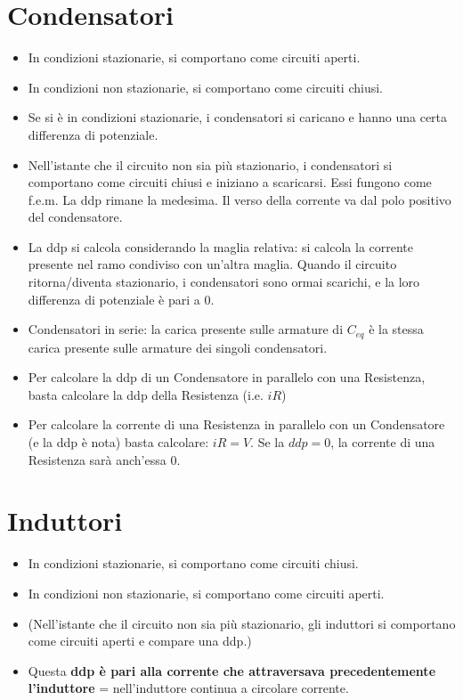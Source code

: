 \documentclass[17pt]{extarticle}
\begin{document}
\section{Condensatori}
\begin{itemize}
    \item In condizioni stazionarie, si comportano come circuiti aperti.
    \item In condizioni non stazionarie, si comportano come circuiti chiusi.
    \item Se si è in condizioni stazionarie, i condensatori si caricano e hanno una certa differenza di potenziale.
    \item Nell’istante che il circuito non sia più stazionario, i condensatori si comportano come circuiti chiusi e iniziano a scaricarsi. Essi fungono come f.e.m. La ddp rimane la medesima. Il verso della corrente va dal polo positivo del condensatore.
    \item La ddp si calcola considerando la maglia relativa: si calcola la corrente presente nel ramo condiviso con un’altra maglia. Quando il circuito ritorna/diventa stazionario, i condensatori sono ormai scarichi, e la loro differenza di potenziale è pari a 0.
    \item Condensatori in serie: la carica presente sulle armature di $C_{eq}$ è la stessa carica presente sulle armature dei singoli condensatori.
    \item Per calcolare la ddp di un Condensatore in parallelo con una Resistenza, basta calcolare la ddp della Resistenza (i.e. $iR$)
    \item Per calcolare la corrente di una Resistenza in parallelo con un Condensatore (e la ddp è nota) basta calcolare: $iR = V$. Se la $ddp = 0$, la corrente di una Resistenza sarà anch’essa 0.

\end{itemize}


\section{Induttori}
\begin{itemize}
    \item In condizioni stazionarie, si comportano come circuiti chiusi.
    \item In condizioni non stazionarie, si comportano come circuiti aperti. 
    \item (Nell’istante che il circuito non sia più stazionario, gli induttori si comportano come circuiti aperti e compare una ddp.)
    \item Questa \textbf{ddp è pari alla corrente che attraversava precedentemente l’induttore} = nell’induttore continua a circolare corrente.
\end{itemize}
\end{document}

